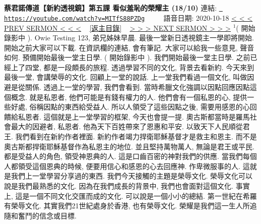 \documentclass{book}
\begin{document}
\section{}
\label{sec:MITfS88PZDg}
\textbf{蔡君諾傳道【新約透視鏡】第五課  看似羞恥的榮耀主 (18/10)}
\newline
\newline
連結: \href{https://youtube.com/watch?v=MITfS88PZDg}{\texttt{ https://youtube.com/watch?v=MITfS88PZDg}} ~~~~ 語音日期: 2020-10-18 
\newline
\newline
\hyperref[sec:meOlDsCMdvQ]{\small{< < < PREV SERMON < < <}}
~
\hyperref[sec:index]{\small{[返主目錄]}}
~
\hyperref[sec:PD1mkT7LGh4]{\small{> > > NEXT SERMON > > >}}
\newline
\newline
$^{1}$( 開始錄影中 ).
Owie Testing 123, 弟兄姊妹早晨.
最後一堂新日透視鏡主一學即將開始.
開始之前大家可以下載.
在資訊欄的連結, 會有筆記.
大家可以給我一些意見, 聲音如何.
預備開始最後一堂主日學.
( 開始錄影中 ).
我們開始最後一堂主日學.
之前已經上了四堂, 都是一段頗長的旅程.
透過學習不同的文化, 背景去看新約.
今天來到最後一堂, 會講榮辱的文化.
回顧上一堂的說話.
上一堂我們看過一個文化, 叫做因避是從關係.
透過上一堂的學習, 我們會看到.
當時希臘文化強調以因點回應因點這個概念.
就是私恩者, 他們可能是有錢有權力的人.
他們會有一個私恩的心, 提供一些好處, 俗稱因點的東西給受益人.
所以人領受了這些因點之後, 需要用感恩的心回饋給私恩者.
這個就是上一堂學習的框架, 今天也會提一提.
奧古斯都當時是羅馬社會最大的因避者, 私恩者.
他為天下百姓帶來了恩惠和平安.
以致天下人民順從君王.
我們看到在新約作者裡面.
新約作者竭力捍衛耶穌基督才是救主和恩主.
而不是奧古斯都捍衛耶穌基督作為私恩主的地位.
並且堅持萬物萬人, 無論是君王或平民.
都是受益人的角色, 領受神恩典的人.
這是口齒百密的神對我們的供應.
當我們每個人都領受這個恩典的時候, 便要用信心和感恩的心去回應神.
作卑微服事的人.
這就是我們上一堂學習分享過的東西.
我們今天接觸的主題是榮辱文化.
榮辱文化可以說是我們最熟悉的文化.
因為在我們成長的背景中, 我們也會面對這個文化.
事實上, 這是一個不同文化交匯而成的文化.
可以說是一個小小的總結.
第一世紀在希羅有榮辱文化.
其實我們21世紀處身於香港, 也有榮辱文化.
榮耀是我們這一生人所追隨和奮鬥的信念或目標.
\end{document}
